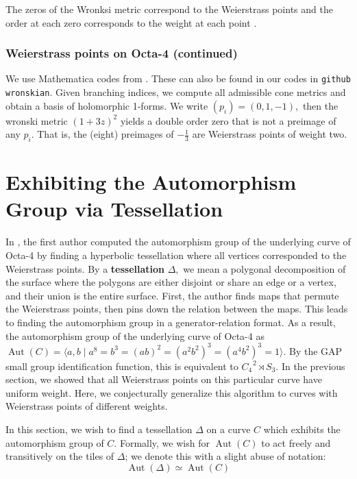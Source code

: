 \documentclass[12pt,reqno]{amsart}
\DeclareMathOperator{\Aut}{Aut}
\theoremstyle{definition}
\theoremstyle{remark}
\begin{document}
The zeros of the Wronksi metric correspond to the Weierstrass points and the order at each zero corresponds to the weight at each point \cite{fk}. 

\subsubsection*{Weierstrass points on Octa-4 (continued)} We use Mathematica codes from \cite{dthesis}. These can also be found in our codes in \texttt{github wronskian}. Given branching indices, we compute all admissible cone metrics and obtain a basis of holomorphic 1-forms. We write $(p_i) = (0, 1, -1),$ then the wronski metric $(1 + 3 z)^2$ yields a double order zero that is not a preimage of any $p_i.$ That is, the (eight) preimages of $- \frac{1}{3}$ are Weierstrass points of weight two. 



\section{Exhibiting the Automorphism Group via Tessellation}
\label{sec:flagflag}


In \cite{dami}, the first author computed the automorphism group of the underlying curve of Octa-4 by finding a hyperbolic tessellation where all vertices corresponded to the Weierstrass points. By a \textbf{tessellation} $\Delta,$ we mean a polygonal decomposition of the surface where the polygons are either disjoint or share an edge or a vertex, and their union is the entire surface. First, the author finds maps that permute the Weierstrass points, then pins down the relation between the maps. This leads to finding the automorphism group in a generator-relation format. As a result, the automorphism group of the underlying curve of Octa-4 as $\Aut(C) = \langle a, b \mid a^8 = b^3 = (ab) ^2 = (a^2b^2)^3 = (a^4b^2)^3 = 1 \rangle.$ By the GAP small group identification function, this is equivalent to $C_4^{\text{ }2} \rtimes S_3.$ In the previous section, we showed that all Weierstrass points on this particular curve have uniform weight. Here, we conjecturally generalize this algorithm to curves with Weierstrass points of different weights. 

In this section, we wish to find a tessellation $\Delta$ on a curve $C$ which exhibits the automorphism group of $C$. Formally, we wish for $\Aut(C)$ to act freely and transitively on the tiles of $\Delta$; we denote this with a slight abuse of notation:
\vspace{-3pt}
$$\Aut(\Delta) \simeq \Aut(C)$$
\end{document}
